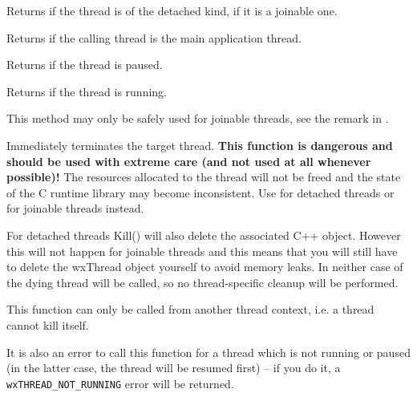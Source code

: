 
Returns \true if the thread is of the detached kind, \false if it is a joinable
one.


\label{wxthreadismain}


Returns \true if the calling thread is the main application thread.


\label{wxthreadispaused}


Returns \true if the thread is paused.


\label{wxthreadisrunning}


Returns \true if the thread is running.

This method may only be safely used for joinable threads, see the remark in 
.


\label{wxthreadkill}


Immediately terminates the target thread. {\bf This function is dangerous and should
be used with extreme care (and not used at all whenever possible)!} The resources
allocated to the thread will not be freed and the state of the C runtime library
may become inconsistent. Use  for detached 
threads or  for joinable threads instead.

For detached threads Kill() will also delete the associated C++ object.
However this will not happen for joinable threads and this means that you will
still have to delete the wxThread object yourself to avoid memory leaks.
In neither case  of the dying thread will be
called, so no thread-specific cleanup will be performed.

This function can only be called from another thread context, i.e. a thread
cannot kill itself.

It is also an error to call this function for a thread which is not running or
paused (in the latter case, the thread will be resumed first) -- if you do it,
a {\tt wxTHREAD\_NOT\_RUNNING} error will be returned.


\label{wxthreadonexit}

